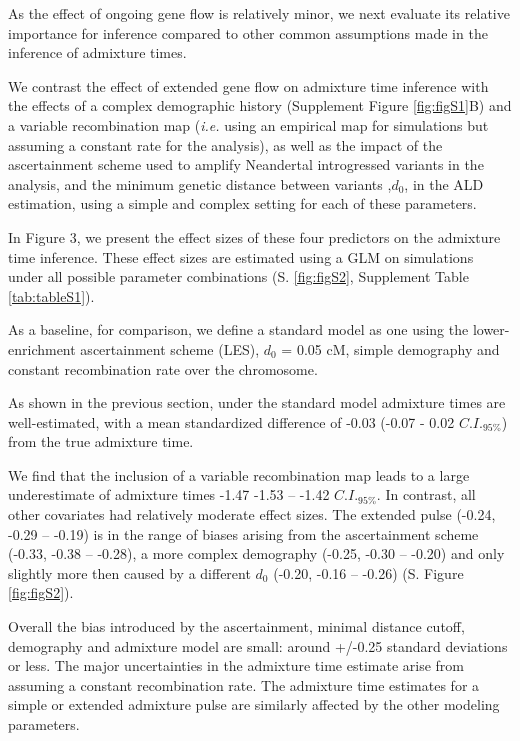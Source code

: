 \documentclass[]{article}
\begin{document}
As the effect of ongoing gene flow is relatively minor, we next evaluate its relative importance for inference compared to other common assumptions made in the inference of admixture times. 

We contrast the effect of extended gene flow on admixture time inference with  the effects of a complex demographic history (Supplement Figure \ref{fig:figS1}B) and a variable recombination map (\emph{i.e.} using an empirical map for simulations but assuming a constant rate for the analysis), as well as the impact of the ascertainment scheme used to amplify Neandertal introgressed variants in the analysis, and the minimum genetic distance between variants ,$d_0$, in the ALD estimation, using a simple and complex setting for each of these parameters. 

In Figure 3, we present the effect sizes of these four predictors on the admixture time inference. These effect sizes are estimated using a GLM on simulations under all possible parameter combinations  (S. \ref{fig:figS2}, Supplement Table \ref{tab:tableS1}).

As a baseline, for comparison, we define a standard model as one using the lower-enrichment ascertainment scheme (LES), $d_{0}$ = 0.05 cM, simple demography and constant recombination rate over the chromosome. 

As shown in the previous section, under the standard model admixture times are well-estimated, with a mean standardized difference of  -0.03 (-0.07 - 0.02 $C.I._{95\%}$) from the true
admixture time.

We find that the  inclusion of a variable recombination map leads to a large underestimate of admixture times -1.47 -1.53 -- -1.42 $C.I._{95\%}$. In contrast, all other covariates had relatively moderate effect sizes. The extended pulse   (-0.24,  -0.29 -- -0.19) is in the range of biases arising from the ascertainment scheme (-0.33, -0.38 --
-0.28), a more complex demography (-0.25, -0.30 -- -0.20) and only slightly more then caused by a different $d_0$ (-0.20, -0.16 --
-0.26) (S. Figure \ref{fig:figS2}).

Overall the bias introduced by the ascertainment, minimal distance
cutoff, demography and admixture model are small: around +/-0.25 standard deviations or less. The major uncertainties in the admixture time
estimate arise from assuming a constant recombination rate. The
admixture time estimates for a simple or extended admixture pulse are similarly affected by the other modeling parameters.
\end{document}
